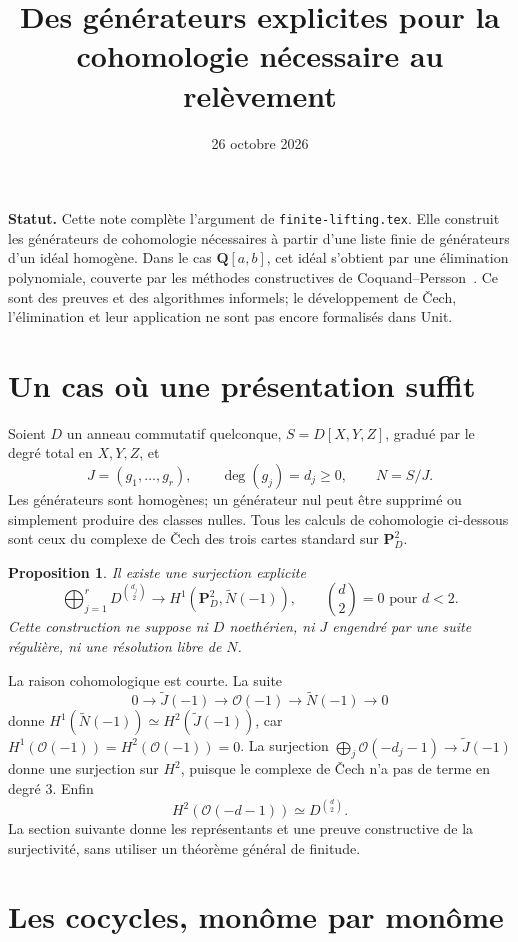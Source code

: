 \documentclass[11pt]{amsart}
\title{Des générateurs explicites pour la cohomologie nécessaire au relèvement}
\date{26 octobre 2026}
\newtheorem{proposition}{Proposition}
\theoremstyle{remark}
\newcommand{\PP}{\mathbf P}
\newcommand{\OO}{\mathcal O}
\begin{document}
\maketitle

\noindent\textbf{Statut.}
Cette note complète l'argument de \texttt{finite-lifting.tex}.
Elle construit les générateurs de cohomologie nécessaires à partir
d'une liste finie de générateurs d'un idéal homogène.
Dans le cas $\mathbf Q[a,b]$, cet idéal s'obtient par une élimination
polynomiale, couverte par les méthodes constructives de
Coquand--Persson~\cite{CP}.
Ce sont des preuves et des algorithmes informels; le développement
de Čech, l'élimination et leur application ne sont pas encore
formalisés dans Unit.

\section{Un cas où une présentation suffit}

Soient $D$ un anneau commutatif quelconque, $S=D[X,Y,Z]$, gradué
par le degré total en $X,Y,Z$, et
\[
 J=(g_1,\ldots,g_r),\qquad \deg(g_j)=d_j\geq0,\qquad N=S/J.
\]
Les générateurs sont homogènes; un générateur nul peut être supprimé
ou simplement produire des classes nulles. Tous les calculs de
cohomologie ci-dessous sont ceux du complexe de Čech des trois cartes
standard sur $\PP^2_D$.

\begin{proposition}\label{prop:finite}
Il existe une surjection explicite
\[
 \bigoplus_{j=1}^r D^{\binom{d_j}{2}}
 \longrightarrow H^1(\PP^2_D,\widetilde N(-1)),
 \qquad \binom d2=0\text{ pour }d<2.
\]
Cette construction ne suppose ni $D$ noethérien, ni $J$ engendré par
une suite régulière, ni une résolution libre de $N$.
\end{proposition}

La raison cohomologique est courte. La suite
\[
 0\longrightarrow\widetilde J(-1)\longrightarrow\OO(-1)
 \longrightarrow\widetilde N(-1)\longrightarrow0
\]
donne $H^1(\widetilde N(-1))\simeq H^2(\widetilde J(-1))$, car
$H^1(\OO(-1))=H^2(\OO(-1))=0$.
La surjection $\bigoplus_j\OO(-d_j-1)\to\widetilde J(-1)$ donne
une surjection sur $H^2$, puisque le complexe de Čech n'a pas de
terme en degré $3$. Enfin
\[
 H^2(\OO(-d-1))\simeq D^{\binom d2}.
\]
La section suivante donne les représentants et une preuve constructive
de la surjectivité, sans utiliser un théorème général de finitude.

\section{Les cocycles, monôme par monôme}
\end{document}
